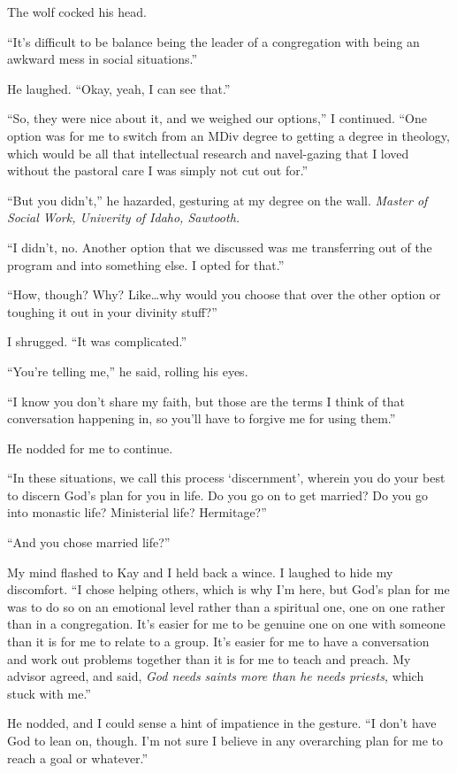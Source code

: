 The wolf cocked his head.

``It's difficult to be balance being the leader of a congregation with being an awkward mess in social situations.''

He laughed. ``Okay, yeah, I can see that.''

``So, they were nice about it, and we weighed our options,'' I continued. ``One option was for me to switch from an MDiv degree to getting a degree in theology, which would be all that intellectual research and navel-gazing that I loved without the pastoral care I was simply not cut out for.''

``But you didn't,'' he hazarded, gesturing at my degree on the wall. \emph{Master of Social Work, Univerity of Idaho, Sawtooth.}

``I didn't, no. Another option that we discussed was me transferring out of the program and into something else. I opted for that.''

``How, though? Why? Like\ldots why would you choose that over the other option or toughing it out in your divinity stuff?''

I shrugged. ``It was complicated.''

``You're telling me,'' he said, rolling his eyes.

``I know you don't share my faith, but those are the terms I think of that conversation happening in, so you'll have to forgive me for using them.''

He nodded for me to continue.

``In these situations, we call this process `discernment', wherein you do your best to discern God's plan for you in life. Do you go on to get married? Do you go into monastic life? Ministerial life? Hermitage?''

``And you chose married life?''

My mind flashed to Kay and I held back a wince. I laughed to hide my discomfort. ``I chose helping others, which is why I'm here, but God's plan for me was to do so on an emotional level rather than a spiritual one, one on one rather than in a congregation. It's easier for me to be genuine one on one with someone than it is for me to relate to a group. It's easier for me to have a conversation and work out problems together than it is for me to teach and preach. My advisor agreed, and said, \emph{God needs saints more than he needs priests,} which stuck with me.''

He nodded, and I could sense a hint of impatience in the gesture. ``I don't have God to lean on, though. I'm not sure I believe in any overarching plan for me to reach a goal or whatever.''

